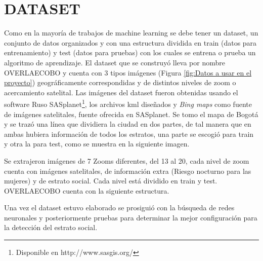 
 \section{DATASET}
 Como en la mayoría de trabajos de machine learning se debe tener un dataset, un conjunto de datos organizados y con una estructura dividida en train (datos para entrenamiento) y test (datos para pruebas) con los cuales se entrena o prueba un algoritmo de aprendizaje. El dataset que se construyó lleva por nombre OVERLAECOBO y cuenta con 3 tipos imágenes (Figura \ref{fig:Datos a usar en el proyecto}) geográficamente correspondidas y de distintos niveles de zoom o acercamiento satelital. Las imágenes del dataset fueron obtenidas usando el software Ruso SASplanet\footnote[14]{Disponible en http://www.sasgis.org/}, los archivos kml diseñados y \textit{Bing maps} como fuente de imágenes satelitales, fuente ofrecida en SASplanet. Se tomo el mapa de Bogotá y se trazó una línea que dividiera la ciudad en dos partes, de tal manera que en ambas hubiera información de todos los estratos, una parte se escogió para train y otra la para test, como se muestra en la siguiente imagen.
 
 
  Se extrajeron imágenes de 7 Zooms diferentes, del 13 al 20,  cada nivel de zoom cuenta con imágenes satelitales, de información extra (Riesgo nocturno para las mujeres) y de estrato social. Cada nivel está dividido en train y test. OVERLAECOBO cuenta con la siguiente estructura.
 
 Una vez el dataset estuvo elaborado se prosiguió con la búsqueda de redes neuronales y posteriormente pruebas para determinar la mejor configuración para la detección del estrato social.
 

